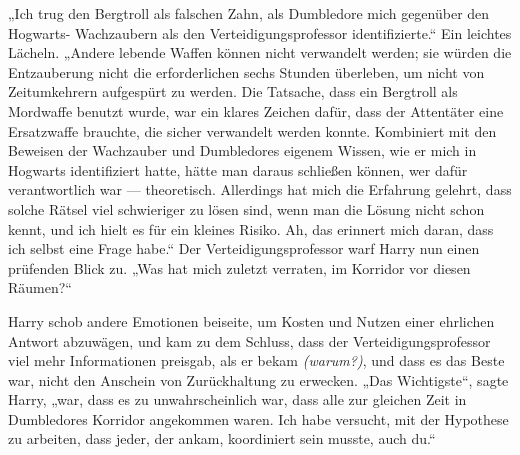 „Ich trug den Bergtroll als falschen Zahn, als Dumbledore mich gegenüber den Hogwarts- Wachzaubern als den Verteidigungsprofessor identifizierte.“
Ein leichtes Lächeln.
„Andere lebende Waffen können nicht verwandelt werden; sie würden die Entzauberung nicht die erforderlichen sechs Stunden überleben, um nicht von Zeitumkehrern aufgespürt zu werden. Die Tatsache, dass ein Bergtroll als Mordwaffe benutzt wurde, war ein klares Zeichen dafür, dass der Attentäter eine Ersatzwaffe brauchte, die sicher verwandelt werden konnte. Kombiniert mit den Beweisen der Wachzauber und Dumbledores eigenem Wissen, wie er mich in Hogwarts identifiziert hatte, hätte man daraus schließen können, wer dafür verantwortlich war — theoretisch. Allerdings hat mich die Erfahrung gelehrt, dass solche Rätsel viel schwieriger zu lösen sind, wenn man die Lösung nicht schon kennt, und ich hielt es für ein kleines Risiko. Ah, das erinnert mich daran, dass ich selbst eine Frage habe.“
Der Verteidigungsprofessor warf Harry nun einen prüfenden Blick zu.
„Was hat mich zuletzt verraten, im Korridor vor diesen Räumen?“

Harry schob andere Emotionen beiseite, um Kosten und Nutzen einer ehrlichen Antwort abzuwägen, und kam zu dem Schluss, dass der Verteidigungsprofessor viel mehr Informationen preisgab, als er bekam \emph{(warum?)}, und dass es das Beste war, nicht den Anschein von Zurückhaltung zu erwecken.
„Das Wichtigste“, sagte Harry, „war, dass es zu unwahrscheinlich war, dass alle zur gleichen Zeit in Dumbledores Korridor angekommen waren. Ich habe versucht, mit der Hypothese zu arbeiten, dass jeder, der ankam, koordiniert sein musste, auch du.“

